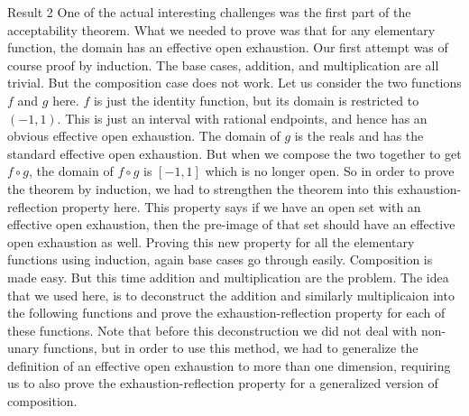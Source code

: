 \begin{frame}{Result 2 }
{    \footnotesize One of the actual interesting challenges was the first part of the acceptability theorem. What we needed to prove was that for any elementary function, the domain has an effective open exhaustion. Our first attempt was of course proof by induction. The base cases, addition, and multiplication are all trivial. But the composition case does not work. Let us consider the two functions $f$ and $g$ here. $f$ is just the identity function, but its domain is restricted to $(-1,1)$. This is just an interval with rational endpoints, and hence has an obvious effective open exhaustion. The domain of $g$ is the reals and has the standard effective open exhaustion. But when we compose the two together to get $f\circ g$, the domain of $f\circ g$ is $[-1,1]$ which is no longer open. So in order to prove the theorem by induction, we had to strengthen the theorem into this exhaustion-reflection property here. This property says if we have an open set with an effective open exhaustion, then the pre-image of that set should have an effective open exhaustion as well. Proving this new property for all the elementary functions using induction, again base cases go through easily. Composition is made easy. But this time addition and multiplication are the problem. The idea that we used here, is to deconstruct the addition and similarly multiplicaion into the following functions and prove the exhaustion-reflection property for each of these functions. Note that before this deconstruction we did not deal with non-unary functions, but in order to use this method, we had to generalize the definition of an effective open exhaustion to more than one dimension, requiring us to also prove the exhaustion-reflection property for a generalized version of composition. }
\end{frame}